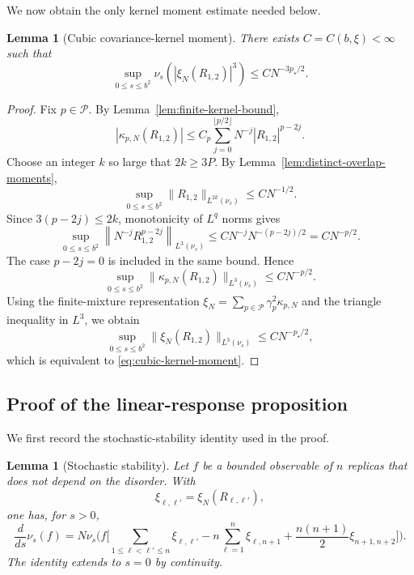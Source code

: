 \documentclass[letterpaper,11pt,reqno]{amsart}
\newtheorem{lem}[thm]{Lemma}
\renewcommand{\leq}{\leqslant}
\renewcommand{\geq}{\geqslant}
\newcommand{\cP}{\mathcal{P}}\newcommand{\cQ}{\mathcal{Q}}\newcommand{\cR}{\mathcal{R}}
\begin{document}
We now obtain the only kernel moment estimate needed below.

\begin{lem}[Cubic covariance-kernel moment]
\label{lem:cubic-kernel-moment}
There exists $C=C(b,\xi)<\infty$ such that
\begin{equation}
\sup_{0\leq s\leq b^2}
\nu_s\left(
\left|\xi_N(R_{1,2})\right|^3
\right)
\leq
C N^{-3p_\star/2}.
\label{eq:cubic-kernel-moment}
\end{equation}
\end{lem}

\begin{proof}
Fix $p\in\cP$. By Lemma~\ref{lem:finite-kernel-bound},
\[
|\kappa_{p,N}(R_{1,2})|
\leq
C_p\sum_{j=0}^{\lfloor p/2\rfloor}
N^{-j}|R_{1,2}|^{p-2j}.
\]
Choose an integer $k$ so large that $2k\geq3P$. By
Lemma~\ref{lem:distinct-overlap-moments},
\[
\sup_{0\leq s\leq b^2}
\|R_{1,2}\|_{L^{2k}(\nu_s)}
\leq
C N^{-1/2}.
\]
Since $3(p-2j)\leq2k$, monotonicity of $L^q$ norms gives
\begin{equation}
\sup_{0\leq s\leq b^2}
\left\|
N^{-j}R_{1,2}^{p-2j}
\right\|_{L^3(\nu_s)}
\leq
C N^{-j}N^{-(p-2j)/2}
=
C N^{-p/2}.
\label{eq:one-kernel-L3}
\end{equation}
The case $p-2j=0$ is included in the same bound. Hence
\[
\sup_{0\leq s\leq b^2}
\|\kappa_{p,N}(R_{1,2})\|_{L^3(\nu_s)}
\leq
C N^{-p/2}.
\]
Using the finite-mixture representation
$\xi_N=\sum_{p\in\cP}\gamma_p^2\kappa_{p,N}$ and the triangle
inequality in $L^3$, we obtain
\[
\sup_{0\leq s\leq b^2}
\|\xi_N(R_{1,2})\|_{L^3(\nu_s)}
\leq
C N^{-p_\star/2},
\]
which is equivalent to \eqref{eq:cubic-kernel-moment}.
\end{proof}

\subsection{Proof of the linear-response proposition}
\label{subsec:proof-linear-response}

We first record the stochastic-stability identity used in the proof.

\begin{lem}[Stochastic stability]
\label{lem:stochastic-stability}
Let $f$ be a bounded observable of $n$ replicas that does not depend on
the disorder. With
\[
\xi_{\ell,\ell'}
=
\xi_N(R_{\ell,\ell'}),
\]
one has, for $s>0$,
\begin{equation}
\frac{d}{ds}\nu_s(f)
=
N\nu_s\Bigg(
 f\Bigg[
\sum_{1\leq\ell<\ell'\leq n}\xi_{\ell,\ell'}
-n\sum_{\ell=1}^n\xi_{\ell,n+1}
+\frac{n(n+1)}2\xi_{n+1,n+2}
\Bigg]
\Bigg).
\label{eq:stochastic-stability}
\end{equation}
The identity extends to $s=0$ by continuity.
\end{lem}
\end{document}
